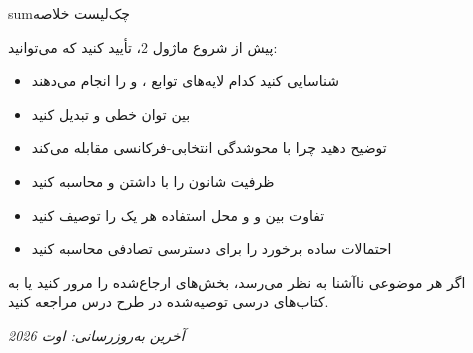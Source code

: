 \begin{CNbox}[unbreakable]{sum}{چک‌لیست خلاصه}

پیش از شروع ماژول 2، تأیید کنید که می‌توانید:

\begin{itemize}
\tightlist
\item
  \lr{\mbox{\CNcheckbox{}}} شناسایی کنید کدام لایه‌های  توابع ،  و  را انجام می‌دهند
\item
  \lr{\mbox{\CNcheckbox{}}} بین توان خطی و  تبدیل کنید
\item
  \lr{\mbox{\CNcheckbox{}}} توضیح دهید چرا  با محوشدگی انتخابی-فرکانسی مقابله می‌کند
\item
  \lr{\mbox{\CNcheckbox{}}} ظرفیت شانون را با داشتن  و  محاسبه کنید
\item
  \lr{\mbox{\CNcheckbox{}}} تفاوت بین  و  و محل استفاده هر یک را توصیف کنید
\item
  \lr{\mbox{\CNcheckbox{}}} احتمالات ساده برخورد را برای دسترسی تصادفی محاسبه کنید
\end{itemize}

اگر هر موضوعی ناآشنا به نظر می‌رسد، بخش‌های ارجاع‌شده را مرور کنید یا به کتاب‌های درسی توصیه‌شده در طرح درس مراجعه کنید.

\emph{آخرین به‌روزرسانی: اوت 2026}

\end{CNbox}
